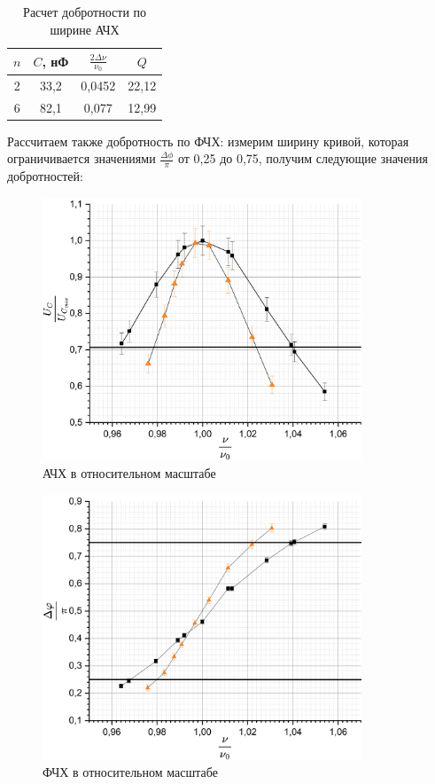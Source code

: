 \documentclass[a4paper, 12pt]{article}
\begin{document}
	\begin{table}[h]
		\centering
		\begin{tabular}{|c|c|c|c|}
			\hline
			$n$ & $C$, нФ & $\frac{2\Delta \nu}{\nu_0}$ & $Q$ \\ \hline
			2 & 33,2 & 0,0452 & 22,12 \\ \hline
			6 & 82,1 & 0,077 & 12,99 \\ \hline
		\end{tabular}
		\caption{Расчет добротности по ширине АЧХ}
	\end{table}
	
	Рассчитаем также добротность по ФЧХ: измерим ширину кривой, которая ограничивается значениями $\frac{\Delta \phi}{\pi}$ от 0,25 до 0,75, получим следующие значения добротностей:
	
	\begin{figure}[H]
		\centering
		\includegraphics[width = 0.85\textwidth, height = 0.44\textheight]{LinedAFCH}
		\caption{АЧХ в относительном масштабе}
	\end{figure}
	
	\begin{figure}[H]
		\centering
		\includegraphics[width = 0.85\textwidth, height = 0.44\textheight]{LinedPhFCH}
		\caption{ФЧХ в относительном масштабе}
	\end{figure}
	
\end{document}
